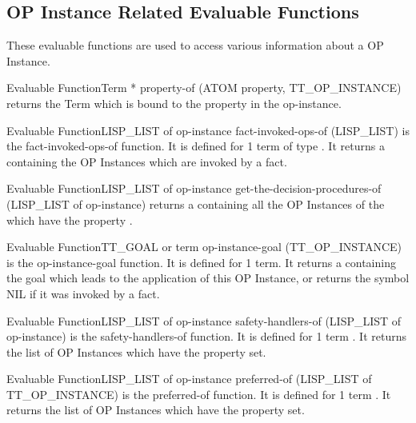 \subsection{OP Instance Related Evaluable Functions}

These evaluable functions are used to access various information about a OP Instance.

\begin{typeefa}{Evaluable Function}{Term *} {property-of} {(ATOM property, TT\_OP\_INSTANCE)} 
returns the Term which is bound to the property  in the
op-instance. 
\end{typeefa}

\begin{typeefa}{Evaluable Function}{LISP\_LIST of op-instance} {fact-invoked-ops-of}
{(LISP\_LIST)}  
is the fact-invoked-ops-of function. It is defined for 1 term of type
. It returns a  containing the OP Instances
which are invoked by a fact. 
\end{typeefa}

\begin{typeefa}{Evaluable Function}{LISP\_LIST of op-instance}
{get-the-decision-procedures-of} {(LISP\_LIST of op-instance)} 
returns a  containing all the OP Instances of the
 which have the property  .
\end{typeefa}

\begin{typeefa}{Evaluable Function}{TT\_GOAL or term} {op-instance-goal} {(TT\_OP\_INSTANCE)}
is the op-instance-goal function. It is defined for 1 term. It returns a
 containing the goal which leads to the application of this OP
Instance, or returns the symbol NIL if it was invoked by a fact.
\end{typeefa}

\begin{typeefa}{Evaluable Function}{LISP\_LIST of op-instance} {safety-handlers-of}
{(LISP\_LIST of op-instance)}
is the safety-handlers-of function. It is defined for 1 term
. It returns the list of OP Instances which have the property
 set.
\end{typeefa}

\begin{typeefa}{Evaluable Function}{LISP\_LIST of op-instance} {preferred-of}
{(LISP\_LIST of TT\_OP\_INSTANCE)} 
is the preferred-of function. It is defined for 1 term . It
returns the list of OP Instances which have the property 
set.
\end{typeefa}

